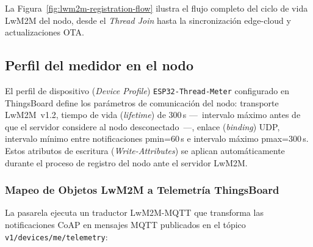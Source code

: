 La Figura~\ref{fig:lwm2m-registration-flow} ilustra el flujo completo del ciclo de vida LwM2M del nodo, desde el \emph{Thread Join} hasta la sincronización edge-cloud y actualizaciones OTA.



\subsection{Perfil del medidor en el nodo}
\label{sec:nodo-configuracion-lwm2m}

El perfil de dispositivo (\emph{Device Profile}) \texttt{ESP32-Thread-Meter} configurado en ThingsBoard define los parámetros de comunicación del nodo: transporte LwM2M~v1.2, tiempo de vida (\emph{lifetime}) de 300\,s ---~intervalo máximo antes de que el servidor considere al nodo desconectado~---, enlace (\emph{binding}) UDP, intervalo mínimo entre notificaciones pmin=60\,s e intervalo máximo pmax=300\,s. Estos atributos de escritura (\emph{Write-Attributes}) se aplican automáticamente durante el proceso de registro del nodo ante el servidor LwM2M.

\subsubsection{Mapeo de Objetos LwM2M a Telemetría ThingsBoard}
\label{sec:nodo-mapeo-telemetria}

La pasarela ejecuta un traductor LwM2M-MQTT que transforma las notificaciones CoAP en mensajes MQTT publicados en el tópico\\\texttt{v1/devices/me/telemetry}:

